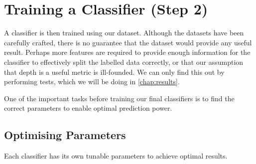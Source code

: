 


\newpage
\section{Training a Classifier (Step 2)}
A classifier is then trained using our dataset. Although the datasets have been carefully crafted, there is no guarantee that the dataset would provide any useful result. Perhaps more features are required to provide enough information for the classifier to effectively split the labelled data correctly, or that our assumption that depth is a useful metric is ill-founded. We can only find this out by performing tests, which we will be doing in \autoref{chap:results}.

One of the important tasks before training our final classifiers is to find the correct parameters to enable optimal prediction power.

\subsection{Optimising Parameters}
Each classifier has its own tunable parameters to achieve optimal results.  

